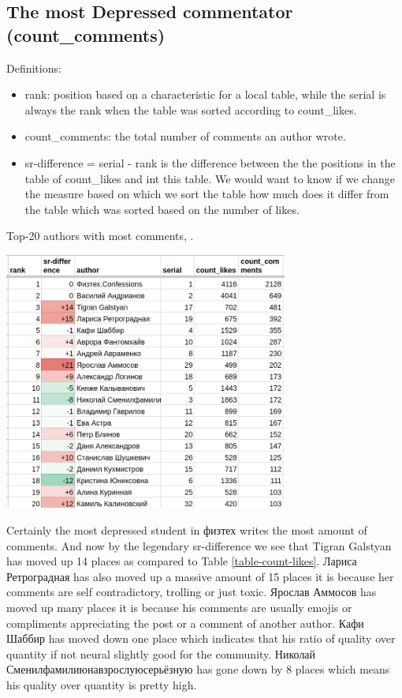 \documentclass[
	11pt
] {article}
\begin{document}
\subsection{The most Depressed commentator (count\_comments)}
	Definitions:
	\begin{itemize}
		\item rank: position based on a characteristic for a local table, while the serial is always the rank when the table was sorted according to count\_likes.
		\item count\_comments: the total number of comments an author wrote.
		\item sr-difference = serial - rank is the difference between the the positions in the table of count\_likes and int this table. We would want to know if we change the measure based on which we sort the table how much does it differ from the table which was sorted based on the number of likes.
	\end{itemize}

	\begin{table}[H]
		\centering
		\caption{Top-20 authors with most comments, \cite{sheet-count-comments}.}
		\label{table-count-comments}
		\includegraphics[width=0.7\textwidth]{table-count-comments-818}
	\end{table}

	Certainly the most depressed student in физтех writes the most amount of comments. And now by the legendary sr-difference we see that Tigran Galstyan has moved up 14 places as compared to Table \ref{table-count-likes}. Лариса Ретроградная has also moved up a massive amount of 15 places it is because her comments are self contradictory, trolling or just toxic. Ярослав Аммосов has moved up many places it is because his comments are usually emojis or compliments appreciating the post or a comment of another author. Кафи Шаббир has moved down one place which indicates that his ratio of quality over quantity if not neural slightly good for the community. Николай Сменилфамилиюнавзрослуюсерьёзную has gone down by 8 places which means his quality over quantity is pretty high.
\end{document}
